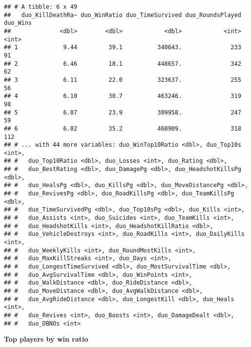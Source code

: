 \documentclass[]{article}
\begin{document}
\begin{verbatim}
## # A tibble: 6 x 49
##   duo_KillDeathRa~ duo_WinRatio duo_TimeSurvived duo_RoundsPlayed duo_Wins
##              <dbl>        <dbl>            <dbl>            <int>    <int>
## 1             9.44         39.1          340643.              233       91
## 2             6.46         18.1          448657.              342       62
## 3             6.11         22.0          323637.              255       56
## 4             6.10         30.7          463246.              319       98
## 5             6.07         23.9          309958.              247       59
## 6             6.02         35.2          460909.              318      112
## # ... with 44 more variables: duo_WinTop10Ratio <dbl>, duo_Top10s <int>,
## #   duo_Top10Ratio <dbl>, duo_Losses <int>, duo_Rating <dbl>,
## #   duo_BestRating <dbl>, duo_DamagePg <dbl>, duo_HeadshotKillsPg <dbl>,
## #   duo_HealsPg <dbl>, duo_KillsPg <dbl>, duo_MoveDistancePg <dbl>,
## #   duo_RevivesPg <dbl>, duo_RoadKillsPg <dbl>, duo_TeamKillsPg <dbl>,
## #   duo_TimeSurvivedPg <dbl>, duo_Top10sPg <dbl>, duo_Kills <int>,
## #   duo_Assists <int>, duo_Suicides <int>, duo_TeamKills <int>,
## #   duo_HeadshotKills <int>, duo_HeadshotKillRatio <dbl>,
## #   duo_VehicleDestroys <int>, duo_RoadKills <int>, duo_DailyKills <int>,
## #   duo_WeeklyKills <int>, duo_RoundMostKills <int>,
## #   duo_MaxKillStreaks <int>, duo_Days <int>,
## #   duo_LongestTimeSurvived <dbl>, duo_MostSurvivalTime <dbl>,
## #   duo_AvgSurvivalTime <dbl>, duo_WinPoints <int>,
## #   duo_WalkDistance <dbl>, duo_RideDistance <dbl>,
## #   duo_MoveDistance <dbl>, duo_AvgWalkDistance <dbl>,
## #   duo_AvgRideDistance <dbl>, duo_LongestKill <dbl>, duo_Heals <int>,
## #   duo_Revives <int>, duo_Boosts <int>, duo_DamageDealt <dbl>,
## #   duo_DBNOs <int>
\end{verbatim}

\textbf{Top players by win ratio}
\end{document}
